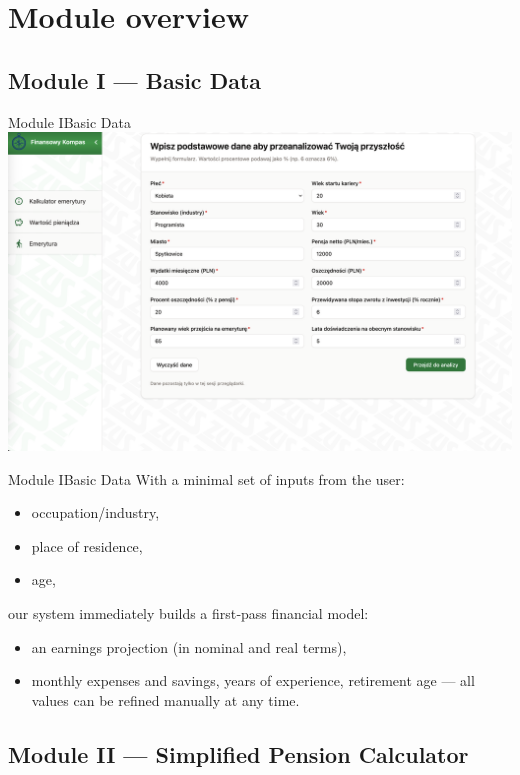 \section{Module overview}

\subsection{Module I --- Basic Data}

\begin{frame}[t]{Module I}{Basic Data}
  \includegraphics[width=.8\textwidth]{img/module_1_basic_data}
\end{frame}

\begin{frame}[t]{Module I}{Basic Data}
With a minimal set of inputs from the user:
\pause
\begin{itemize}
  \item occupation/industry,
  \pause
  \item place of residence,
  \pause
  \item age,
\end{itemize}
\pause
our system immediately builds a first‑pass financial model:
\begin{itemize}
  \pause
  \item an earnings projection (in nominal and real terms),
  \pause
  \item monthly expenses and savings, years of experience, retirement age —
        all values can be refined manually at any time.
\end{itemize}
\end{frame}

\subsection{Module II --- Simplified Pension Calculator}

